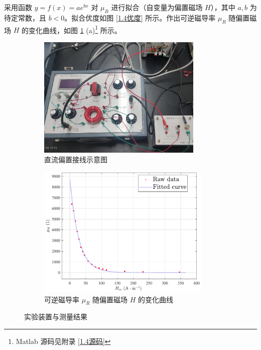 \documentclass[UTF8]{article}
\theoremstyle{MyLineTheoremStyle} %
\theoremstyle{MyBlockTheoremStyle} %
\theoremstyle{MySubsubsectionStyle} %
\begin{document}
采用函数 $y = f(x) = ae^{bx}$ 对 $\mu_R$ 进行拟合（自变量为偏置磁场 $H$），其中 $a, b$ 为待定常数，且 $b < 0$。拟合优度如图 \ref{1.4优度} 所示。作出可逆磁导率 $\mu_R$ 随偏置磁场 $H$ 的变化曲线，如图 \ref{1.4图} (a)\footnote{Matlab 源码见附录 \ref{1.4源码}} 所示。

\begin{figure}[H]\centering
    \begin{subfigure}[b]{0.5\columnwidth}\centering
        \includegraphics[height=165pt]{assets/1.4/image (9).png}
        \vspace*{3.5mm}
        \caption{直流偏置接线示意图}
    \end{subfigure}\hfill
\begin{subfigure}[b]{0.5\columnwidth}\centering
    \includegraphics[height=180pt]{assets/1.4/2024-10-29_00-27-21.pdf}
    \caption{可逆磁导率 $\mu_R$ 随偏置磁场 $H$ 的变化曲线}
\end{subfigure}
\caption{实验装置与测量结果}\label{1.4图}
\end{figure}
\end{document}
